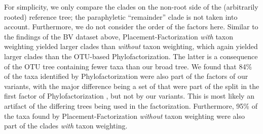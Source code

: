 
For simplicity, we only compare the clades on the non-root side of the (arbitrarily rooted) reference tree;
the paraphyletic ``remainder'' clade is not taken into account.
Furthermore, we do not consider the order of the factors here.
Similar to the findings of the \ac{BV} dataset above,
Placement-Factorization \emph{with} taxon weighting yielded larger clades than \emph{without} taxon weighting,
which again yielded larger clades than the OTU-based Phylofactorization.
The latter is a consequence of the OTU tree containing fewer taxa than our broad  tree.
We found that 84\% of the taxa identified by Phylofactorization were also part of the factors of our variants,
with the major difference being a set of 
that were part of the split in the first factor of Phylofactorization \cite{Washburne2017a}, but not by our variants.
This is most likely an artifact of the differing trees being used in the factorization.
Furthermore, 95\% of the taxa found by Placement-Factorization \emph{without} taxon weighting
were also part of the clades \emph{with} taxon weighting.

